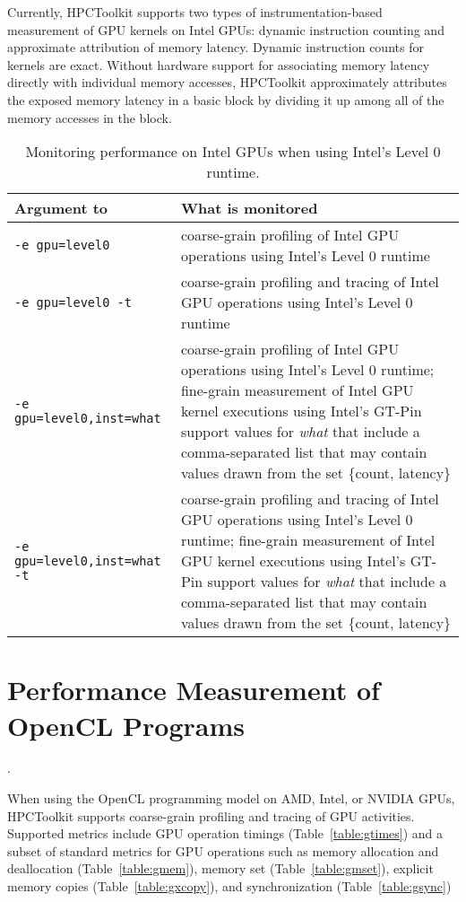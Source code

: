 Currently, HPCToolkit supports two types of instrumentation-based measurement of GPU kernels on Intel GPUs: dynamic instruction counting and approximate attribution of memory latency. Dynamic instruction counts for kernels are exact. Without hardware support for associating memory latency directly with individual memory accesses, HPCToolkit approximately attributes the exposed memory latency in a basic block by dividing it up among all of the memory accesses in the block.

\begin{table}[t]
\centering
\begin{tabular}{|l|p{3.5in}|}\hline
Argument to \hpcrun{} & What is monitored\\\hline\hline
{\tt -e gpu=level0} & coarse-grain profiling of Intel GPU operations using Intel's Level 0 runtime\\\hline
{\tt -e gpu=level0 -t} & coarse-grain profiling and tracing of Intel GPU operations using Intel's Level 0 runtime\\\hline
{\tt -e gpu=level0,inst=what} & coarse-grain profiling of Intel GPU operations using Intel's Level 0 runtime;  fine-grain measurement of Intel GPU kernel executions using Intel's GT-Pin support values for {\em what} that include a comma-separated list that may contain values drawn from the set \{count, latency\}\\\hline
{\tt -e gpu=level0,inst=what -t } & coarse-grain profiling and tracing of Intel GPU operations using Intel's Level 0 runtime;  fine-grain measurement of Intel GPU kernel executions using Intel's GT-Pin support values for {\em what} that include a comma-separated list that may contain values drawn from the set \{count, latency\}\\\hline
\end{tabular}
\caption{Monitoring performance on Intel GPUs when using Intel's Level 0 runtime.}
\label{intel-level0-options}
\end{table}

\section{Performance Measurement of OpenCL Programs}
\label{sec:gpu-opencl}.


When using the OpenCL programming model on AMD, Intel, or NVIDIA GPUs, HPCToolkit supports coarse-grain profiling and tracing of GPU activities.
Supported metrics include GPU operation timings (Table~\ref{table:gtimes}) and a subset of standard metrics for GPU operations such as memory allocation and deallocation (Table~\ref{table:gmem}), memory set (Table~\ref{table:gmset}), explicit memory copies (Table~\ref{table:gxcopy}), and synchronization (Table~\ref{table:gsync})


